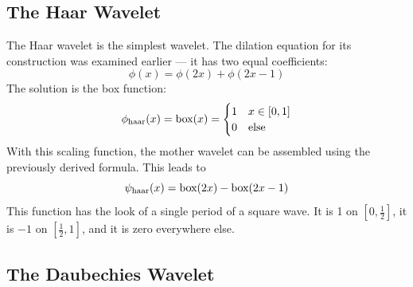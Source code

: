 \documentclass[onecolumn]{gwclass}
\begin{document}
\subsection{The Haar Wavelet}
The Haar wavelet is the simplest wavelet. The dilation equation for its construction was examined earlier --- it has two equal coefficients:
$$ \phi(x) = \phi(2x) + \phi(2x - 1) $$
The solution is the box function:
$$ \phi_{\text{\normalfont{haar}}}(x) = \text{\normalfont{box}}(x) = \begin{cases}
	1 & x \in [0,1]\\
	0 & \text{\normalfont{else}}
\end{cases} $$
With this scaling function, the mother wavelet can be assembled using the previously derived formula. This leads to 
$$ \psi_{\text{\normalfont{haar}}}(x) = \text{\normalfont{box}}(2x) - \text{\normalfont{box}}(2x-1) $$
This function has the look of a single period of a square wave. It is 1 on $[0,\frac{1}{2}]$, it is $-1$ on $[\frac{1}{2}, 1]$, and it is zero everywhere else.


\subsection{The Daubechies Wavelet}
\end{document}
